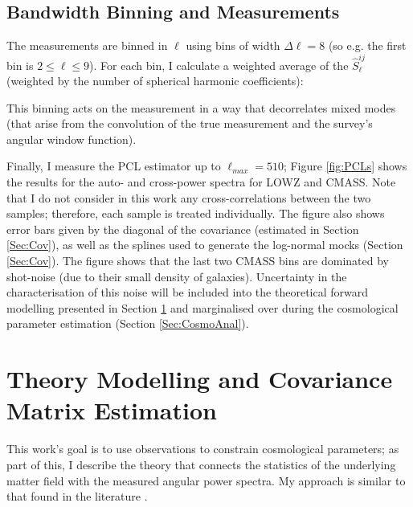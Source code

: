 \subsection{Bandwidth Binning and Measurements}

The measurements are binned in $\ell$ using bins of width $\Delta\ell = 8$ (so e.g. the first bin is $2 \leq \ell \leq 9$). For each bin, I calculate a weighted average of the $\hat{S}_{\ell}^{ij}$ (weighted by the number of spherical harmonic coefficients):


\noindent This binning acts on the measurement in a way that decorrelates mixed modes (that arise from the convolution of the true measurement and the survey's angular window function). 

\qquad Finally, I measure the PCL estimator up to $\ell_{max} = 510$; Figure \ref{fig:PCLs} shows the results for the auto- and cross-power spectra for LOWZ and CMASS. Note that I do not consider in this work any cross-correlations between the two samples; therefore, each sample is treated individually. The figure also shows error bars given by the diagonal of the covariance (estimated in Section \ref{Sec:Cov}), as well as the splines used to generate the log-normal mocks (Section \ref{Sec:Cov}). The figure shows that the last two CMASS bins are dominated by shot-noise (due to their small density of galaxies). Uncertainty in the characterisation of this noise will be included into the theoretical forward modelling presented in Section \ref{Sec:Theory} and marginalised over during the cosmological parameter estimation (Section \ref{Sec:CosmoAnal}).



\section{Theory Modelling and Covariance Matrix Estimation}\label{Sec:Theory}
This work's goal is to use observations to constrain cosmological parameters; as part of this, I describe the theory that connects the statistics of the underlying matter field with the measured angular power spectra. My approach is similar to that found in the literature \citep{ScharfLahav1992,2001Huterer,Padm2007,Thomas2011,Asorey2012}.

